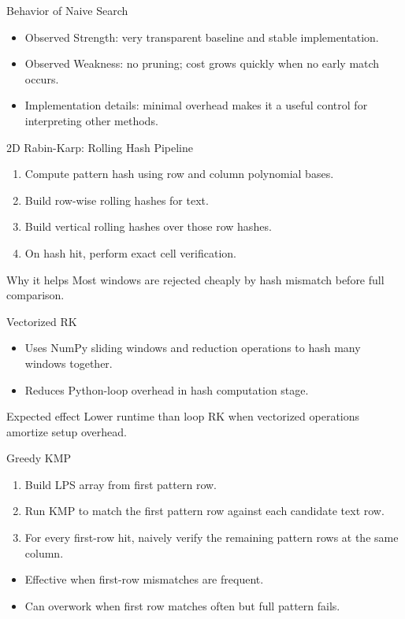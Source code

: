 \begin{frame}{Behavior of Naive Search}
\small
\begin{itemize}
  \item Observed Strength: very transparent baseline and stable implementation.
  \item Observed Weakness: no pruning; cost grows quickly when no early match occurs.
  \item Implementation details: minimal overhead makes it a useful control for interpreting other methods.
\end{itemize}
\end{frame}

\begin{frame}{2D Rabin-Karp: Rolling Hash Pipeline}
\small
\begin{enumerate}
  \item Compute pattern hash using row and column polynomial bases.
  \item Build row-wise rolling hashes for text.
  \item Build vertical rolling hashes over those row hashes.
  \item On hash hit, perform exact cell verification.
\end{enumerate}
\begin{block}{Why it helps}
Most windows are rejected cheaply by hash mismatch before full comparison.
\end{block}
\end{frame}

\begin{frame}{Vectorized RK}
\small
\begin{itemize}
  \item Uses NumPy sliding windows and reduction operations to hash many windows together.
  \item Reduces Python-loop overhead in hash computation stage.
\end{itemize}
\begin{block}{Expected effect}
Lower runtime than loop RK when vectorized operations amortize setup overhead.
\end{block}
\end{frame}

\begin{frame}{Greedy KMP}
\small
\begin{enumerate}
  \item Build LPS array from first pattern row.
  \item Run KMP to match the first pattern row against each candidate text row.
  \item For every first-row hit, naively verify the remaining pattern rows at the same column.
\end{enumerate}
\begin{itemize}
  \item Effective when first-row mismatches are frequent.
  \item Can overwork when first row matches often but full pattern fails.
\end{itemize}
\end{frame}

